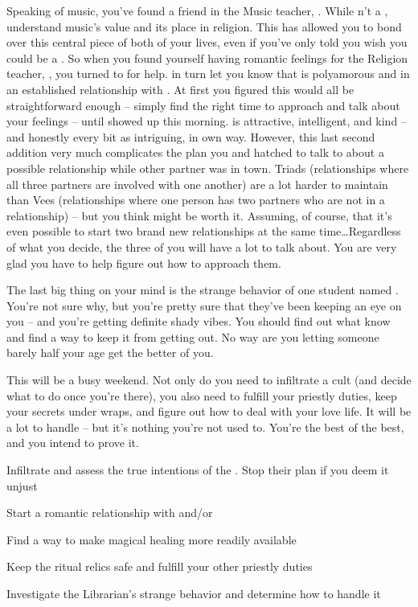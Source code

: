 \documentclass[char]{GL2020}
\begin{document}
Speaking of music, you’ve found a friend in the Music teacher, \cMusic{}. While \cMusic{\they} \cMusic{\are}n’t a \cMusic{\cleric} \cMusic{\themself}, \cMusic{\they} understand \cMusic{\plural} music’s value and its place in religion.  This has allowed you to bond over this central piece of both of your lives, even if you’ve only told \cMusic{\them} you wish you could be a \cInterpol{\cleric}. So when you found yourself having romantic feelings for the Religion teacher, \cBeetle{}, you turned to \cMusic{} for help. \cMusic{} in turn let you know that \cBeetle{} is polyamorous and in an established relationship with \cJuniorStatesman{}. At first you figured this would all be straightforward enough -- simply find the right time to approach \cBeetle{} and talk about your feelings -- until \cJuniorStatesman{} showed up this morning. \cJuniorStatesman{} is attractive, intelligent, and kind -- and honestly every bit as intriguing, in \cJuniorStatesman{\their} own way. However, this last second addition very much complicates the plan you and \cMusic{} hatched to talk to \cBeetle{} about a possible relationship while \cBeetle{\their} other partner was in town. Triads (relationships where all three partners are involved with one another) are a lot harder to maintain than Vees (relationships where one person has two partners who are not in a relationship) -- but you think \cJuniorStatesman{} might be worth it. Assuming, of course, that it’s even possible to start two brand new relationships at the same time\ldots Regardless of what you decide, the three of you will have a lot to talk about. You are very glad you have \cMusic{} to help figure out how to approach them.

The last big thing on your mind is the strange behavior of one \pFarm{} student named \cLibAssist{}. You’re not sure why, but you’re pretty sure that they’ve been keeping an eye on you -- and you’re getting definite shady vibes. You should find out what \cLibAssist{\they} know\cLibAssist{\plural} and find a way to keep it from getting out. No way are you letting someone barely half your age get the better of you.

This will be a busy weekend. Not only do you need to infiltrate a cult (and decide what to do once you’re there), you also need to fulfill your priestly duties, keep your secrets under wraps, and figure out how to deal with your love life. It will be a lot to handle -- but it’s nothing you’re not used to. You’re the best of the best, and you intend to prove it.


\begin{itemz}[Goals]
	\item Infiltrate and assess the true intentions of the \pGoaties{}. Stop their plan if you deem it unjust
	\item Start a romantic relationship with \cBeetle{} and/or \cJuniorStatesman{}
	\item Find a way to make magical healing more readily available
	\item Keep the ritual relics safe and fulfill your other priestly duties
\item Investigate the Librarian’s strange behavior and determine how to handle it
\end{itemz}
\end{document}
